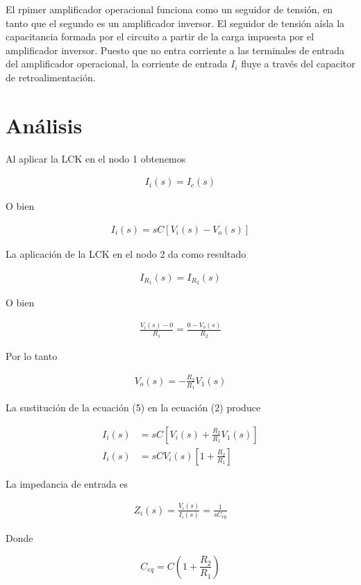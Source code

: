 \documentclass{article}
\begin{document}
El rpimer amplificador operacional funciona como un seguidor de tensión, en tanto que el segundo es un amplificador inversor. El seguidor de tensión aísla la capacitancia formada por el circuito a partir de la carga impuesta por el amplificador inversor. Puesto que no entra corriente a las terminales de entrada del amplificador operacional, la corriente de entrada $I_i$ fluye a través del capacitor de retroalimentación.

\section*{Análisis}
Al aplicar la LCK en el nodo 1 obtenemos

\begin{align}
	I_i(s) = I_c(s)
\end{align}

O bien

\begin{align}
	I_i(s) = sC\left[ V_i(s) - V_o(s) \right]
\end{align}

La aplicación de la LCK en el nodo 2 da como resultado

\begin{align}
	I_{R_1}(s) = I_{R_2}(s)
\end{align}

O bien

\begin{align}
	\frac{V_i(s) - 0}{R_1} = \frac{0-V_o(s)}{R_2}
\end{align}

Por lo tanto

\begin{align}
	V_o(s) = -\frac{R_2}{R_1}V_1(s)
\end{align}

La sustitución de la ecuación (5) en la ecuación (2) produce

\begin{align}
	I_i(s) &= sC\left[ V_i(s) + \frac{R_2}{R_1}V_1(s) \right] \nonumber \\
	I_i(s) &= sCV_i(s)\left[ 1  +\frac{R_2}{R_1} \right]
\end{align}

La impedancia de entrada es

\begin{align}
	Z_i(s) = \frac{V_i(s)}{I_i(s)} = \frac{1}{sC_{eq}}
\end{align}

Donde
\begin{tcolorbox}[colback=red!5!white,colframe=red!75!black,arc=0mm,boxrule=0mm,width=(\linewidth+0.5cm)]
	\begin{equation}
		C_{eq} = C \left(1 + \frac{R_2}{R_1}\right)
	\end{equation}
\end{tcolorbox}
\end{document}
